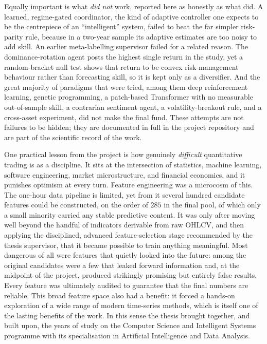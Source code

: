 Equally important is what \textit{did not} work, reported here as honestly as what did. A learned, regime-gated coordinator, the kind of adaptive controller one expects to be the centrepiece of an ``intelligent'' system, failed to beat the far simpler risk-parity rule, because in a two-year sample its adaptive estimates are too noisy to add skill. An earlier meta-labelling supervisor failed for a related reason. The dominance-rotation agent posts the highest single return in the study, yet a random-bracket null test shows that return to be convex risk-management behaviour rather than forecasting skill, so it is kept only as a diversifier. And the great majority of paradigms that were tried, among them deep reinforcement learning, genetic programming, a patch-based Transformer with no measurable out-of-sample skill, a contrarian sentiment agent, a volatility-breakout rule, and a cross-asset experiment, did not make the final fund. These attempts are not failures to be hidden; they are documented in full in the project repository and are part of the scientific record of the work.


One practical lesson from the project is how genuinely \textit{difficult} quantitative trading is as a discipline. It sits at the intersection of statistics, machine learning, software engineering, market microstructure, and financial economics, and it punishes optimism at every turn. Feature engineering was a microcosm of this. The one-hour data pipeline is limited, yet from it several hundred candidate features could be constructed, on the order of $285$ in the final pool, of which only a small minority carried any stable predictive content. It was only after moving well beyond the handful of indicators derivable from raw OHLCV, and then applying the disciplined, advanced feature-selection stage recommended by the thesis supervisor, that it became possible to train anything meaningful. Most dangerous of all were features that quietly looked into the future: among the original candidates were a few that leaked forward information and, at the midpoint of the project, produced strikingly promising but entirely false results. Every feature was ultimately audited to guarantee that the final numbers are reliable. This broad feature space also had a benefit: it forced a hands-on exploration of a wide range of modern time-series methods, which is itself one of the lasting benefits of the work. In this sense the thesis brought together, and built upon, the years of study on the Computer Science and Intelligent Systems programme with its specialisation in Artificial Intelligence and Data Analysis.


